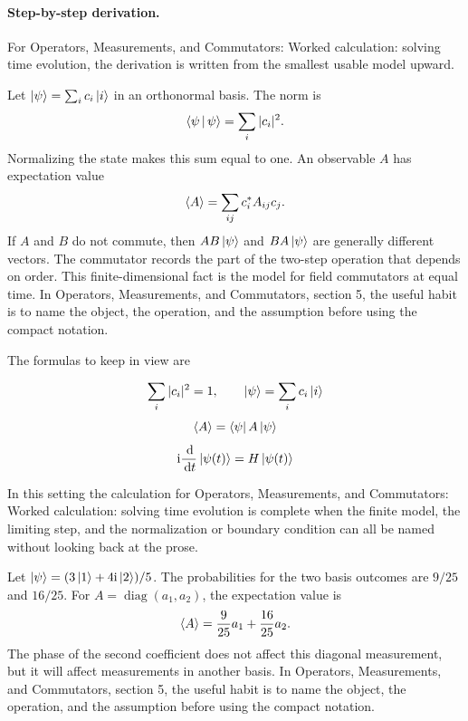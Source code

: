 \paragraph{Step-by-step derivation.}

For Operators, Measurements, and Commutators: Worked calculation: solving time evolution, the derivation is written from the smallest usable model upward.

Let \(\left|\psi\right\rangle=\sum_i c_i\left|i\right\rangle\) in an orthonormal basis.  The norm is
\[
  \left\langle \psi\,\middle|\,\psi\right\rangle=\sum_i |c_i|^2.
\]
Normalizing the state makes this sum equal to one.  An observable \(A\) has expectation value
\[
  \left\langle A\right\rangle=\sum_{ij}c_i^*A_{ij}c_j.
\]
If \(A\) and \(B\) do not commute, then \(AB\left|\psi\right\rangle\) and \(BA\left|\psi\right\rangle\) are generally different vectors.  The commutator records the part of the two-step operation that depends on order.  This finite-dimensional fact is the model for field commutators at equal time.  In Operators, Measurements, and Commutators, section 5, the useful habit is to name the object, the operation, and the assumption before using the compact notation.

The formulas to keep in view are

\[
  \sum_i |c_i|^2=1,\qquad \left|\psi\right\rangle=\sum_i c_i\left|i\right\rangle
\]
\[
  \left\langle A\right\rangle=\left\langle \psi\right|A\left|\psi\right\rangle
\]
\[
  \mathrm i\frac{\,\mathrm d}{\,\mathrm d t}\left|\psi(t)\right\rangle=H\left|\psi(t)\right\rangle
\]

In this setting the calculation for Operators, Measurements, and Commutators: Worked calculation: solving time evolution is complete when the finite model, the limiting step, and the normalization or boundary condition can all be named without looking back at the prose.




\begin{example}
Let \(\left|\psi\right\rangle=(3\left|1\right\rangle+4\mathrm i\left|2\right\rangle)/5\).  The probabilities for the two basis outcomes are \(9/25\) and \(16/25\).  For \(A=\operatorname{diag}(a_1,a_2)\), the expectation value is
\[
  \left\langle A\right\rangle=\frac{9}{25}a_1+\frac{16}{25}a_2.
\]
The phase of the second coefficient does not affect this diagonal measurement, but it will affect measurements in another basis.  In Operators, Measurements, and Commutators, section 5, the useful habit is to name the object, the operation, and the assumption before using the compact notation.
\end{example}



